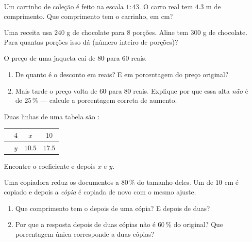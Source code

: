 \begin{exercise}[$\star$]\label{exo:g7:prop:7}
Um carrinho de coleção é feito na escala $1 : 43$. O carro real tem
$4.3$ m de comprimento. Que comprimento tem o carrinho, em cm?
\end{exercise}

\begin{exercise}[$\star\star$]\label{exo:g7:prop:8}
Uma receita usa $240$ g de chocolate para $8$ porções. Aline tem
$300$ g de chocolate. Para quantas porções isso dá (número inteiro de
porções)?
\end{exercise}

\begin{exercise}[$\star\star$]\label{exo:g7:prop:9}
O preço de uma jaqueta cai de $80$ para $60$ reais.
\begin{enumerate}
  \item De quanto é o desconto em reais? E em porcentagem do preço
        original?
  \item Mais tarde o preço volta de $60$ para $80$ reais. Explique por
        que essa alta \emph{não} é de $25\,\%$ --- calcule a
        porcentagem correta de aumento.
\end{enumerate}
\end{exercise}

\begin{exercise}[$\star\star$]\label{exo:g7:prop:10}
Duas linhas de uma tabela são :
\begin{center}
\renewcommand{\arraystretch}{1.2}
\begin{tabular}{l|ccc}
 & $4$ & $x$ & $10$ \\
\hline
 & $y$ & $10.5$ & $17.5$ \\
\end{tabular}
\end{center}
Encontre o coeficiente e depois $x$ e $y$.
\end{exercise}

\begin{exercise}[$\star\star\star$]\label{exo:g7:prop:11}
Uma copiadora reduz os documentos a $80\,\%$ do tamanho deles. Um
 de $10$ cm é copiado e depois a \emph{cópia} é copiada de
novo com o mesmo ajuste.
\begin{enumerate}
  \item Que comprimento tem o  depois de uma cópia? E depois de
        duas?
  \item Por que a resposta depois de duas cópias não é $60\,\%$ do
        original? Que porcentagem única corresponde a duas cópias?
\end{enumerate}
\end{exercise}


